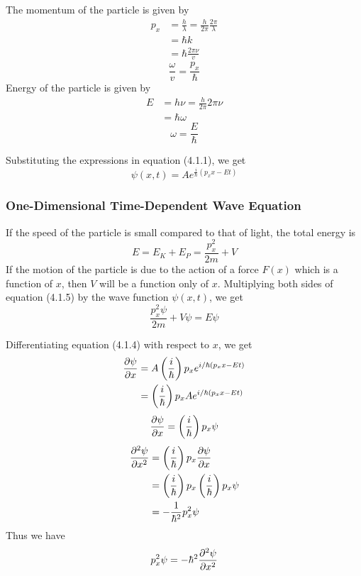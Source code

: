 \documentclass[12pt]{article}
\numberwithin{equation}{subsection}
\begin{document}
The momentum of the particle is given by
\begin{align*}
    p_x &= \frac{h}{\lambda} = \frac{h}{2\pi}\frac{2\pi}{\lambda} \\
    &= \hbar k \\
    &= \hbar \frac{2\pi\nu}{v}
\end{align*}
\begin{equation}
    \frac{\omega}{v} = \frac{p_x}{\hbar}
\end{equation}
Energy of the particle is given by
\begin{align*}
    E &= h\nu = \frac{h}{2\pi}2\pi\nu \\
    &= \hbar \omega
\end{align*}
\begin{equation}
    \omega = \frac{E}{\hbar}
\end{equation}

Substituting the expressions in equation (4.1.1), we get
\begin{equation}
    \boxed{ \psi(x, t) = A e^{\frac{i}{\hbar}\left( p_{x}x - Et \right)} }
\end{equation}

\subsubsection{One-Dimensional Time-Dependent Wave Equation}
If the speed of the particle is small compared to that of light, the total energy is
\begin{equation}
    E = E_K + E_P = \frac{p_{x}^2}{2m} + V
\end{equation}
If the motion of the particle is due to the action of a force $F(x)$ which is a function of $x$, then $V$ will be a function only of $x$. Multiplying both sides of equation (4.1.5) by the wave function $\psi(x,t)$, we get
\begin{equation}
    \frac{p_x^2 \psi}{2m} + V\psi = E\psi
\end{equation}

Differentiating equation (4.1.4) with respect to $x$, we get
\begin{align*}
    \pdv{\psi}{x} &= A \left( \frac{i}{\hbar} \right)p_x e^{i/\hbar (p_x x - Et)} \\
    &= \left( \frac{i}{\hbar} \right) p_x A e^{i/\hbar (p_x x - Et)}
\end{align*}
\begin{equation}
    \pdv{\psi}{x} = \left( \frac{i}{\hbar} \right) p_x \psi
\end{equation}
\begin{align*}
    \pdv[2]{\psi}{x} &= \left( \frac{i}{\hbar} \right) p_x \pdv{\psi}{x} \\
    &= \left( \frac{i}{\hbar} \right) p_x \left( \frac{i}{\hbar} \right) p_x \psi \\
    &= -\frac{1}{\hbar^2} p_x^2 \psi
\end{align*}
Thus we have
\begin{equation}
    p_{x}^2 \psi = -\hbar^2 \pdv[2]{\psi}{x}
\end{equation}\\~\\
\end{document}
